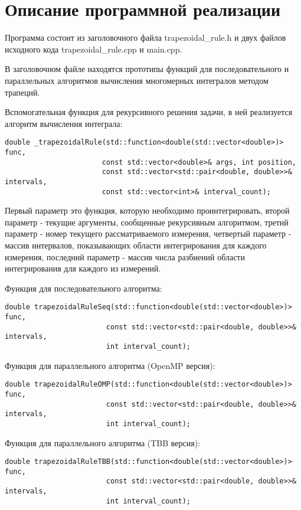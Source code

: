 \documentclass{report}
\begin{document}
\section*{Описание программной реализации}
Программа состоит из заголовочного файла trapezoidal\_rule.h и двух файлов исходного кода trapezoidal\_rule.cpp и main.cpp.
\par В заголовочном файле находятся прототипы функций для последовательного и параллельных алгоритмов вычисления многомерных интегралов методом трапеций.
\par Вспомогательная функция для рекурсивного решения задачи, в ней реализуется алгоритм вычисления интеграла:
\begin{lstlisting}
double _trapezoidalRule(std::function<double(std::vector<double>)> func,
                       const std::vector<double>& args, int position,
                       const std::vector<std::pair<double, double>>& intervals,
                       const std::vector<int>& interval_count);
\end{lstlisting}
\par Первый параметр это функция, которую необходимо проинтегрировать, второй параметр - текущие аргументы, сообщенные рекурсивным алгоритмом, третий параметр - номер текущего рассматриваемого измерения,  четвертый параметр - массив интервалов, показывающих области интегрирования для каждого измерения, последний параметр - массив числа разбиений области интегрирования для каждого из измерений.
\par Функция для последовательного алгоритма:
\begin{lstlisting}
double trapezoidalRuleSeq(std::function<double(std::vector<double>)> func,
                        const std::vector<std::pair<double, double>>& intervals,
                        int interval_count);
\end{lstlisting}
\par Функция для параллельного алгоритма (OpenMP версия):
\begin{lstlisting}
double trapezoidalRuleOMP(std::function<double(std::vector<double>)> func,
                        const std::vector<std::pair<double, double>>& intervals,
                        int interval_count);
\end{lstlisting}
\par Функция для параллельного алгоритма (TBB версия):
\begin{lstlisting}
double trapezoidalRuleTBB(std::function<double(std::vector<double>)> func,
                        const std::vector<std::pair<double, double>>& intervals,
                        int interval_count);
\end{lstlisting}
\end{document}
